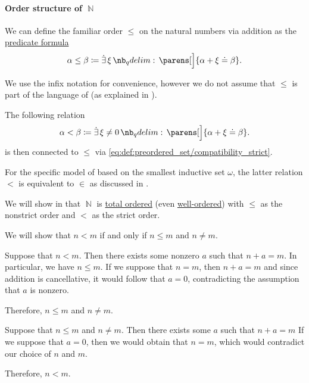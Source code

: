 \paragraph{Order structure of \( \BbbN \)}

\begin{definition}\label{def:natural_numbers_ordering}
  We can define the familiar order \( \leq \) on the natural numbers via addition as the \hyperref[rem:predicate_formula]{predicate formula}
  \begin{equation}\label{eq:def:natural_numbers_ordering/predicate}
    \alpha \leq \beta \coloneqq \qexists \xi \parens[\Big]{ \alpha + \xi \syneq \beta }.
  \end{equation}

  We use the infix notation for convenience, however we do not assume that \( \leq \) is part of the language of  (as explained in ).

  The following relation
  \begin{equation}\label{eq:def:natural_numbers_ordering/strict_predicate}
    \alpha < \beta \coloneqq \qexists {\xi \neq 0} \parens[\Big]{ \alpha + \xi \syneq \beta }.
  \end{equation}
  is then connected to \( \leq \) via \eqref{eq:def:preordered_set/compatibility_strict}.
\end{definition}
\begin{comments}
  \item For the specific model of  based on the smallest inductive set \( \omega \), the latter relation \( < \) is equivalent to \( \in \) as discussed in .
  \item We will show in  that \( \BbbN \) is \hyperref[def:totally_ordered_set]{total ordered} (even \hyperref[def:well_ordered_set]{well-ordered}) with \( \leq \) as the nonstrict order and \( < \) as the strict order.
\end{comments}
\begin{defproof}
  We will show that \( n < m \) if and only if \( n \leq m \) and \( n \neq m \).

  \SufficiencySubProof Suppose that \( n < m \). Then there exists some nonzero \( a \) such that \( n + a = m \). In particular, we have \( n \leq m \). If we suppose that \( n = m \), then \( n + a = m \) and since addition is cancellative, it would follow that \( a = 0 \), contradicting the assumption that \( a \) is nonzero.

  Therefore, \( n \leq m \) and \( n \neq m \).

  \NecessitySubProof Suppose that \( n \leq m \) and \( n \neq m \). Then there exists some \( a \) such that \( n + a = m \) If we suppose that \( a = 0 \), then we would obtain that \( n = m \), which would contradict our choice of \( n \) and \( m \).

  Therefore, \( n < m \).
\end{defproof}

